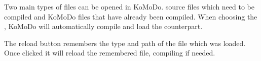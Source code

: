 \graphicspath{ {images/files/} }

Two main types of files can be opened in KoMoDo.  source files which need to be compiled and  KoMoDo files that have already been compiled. When choosing the , KoMoDo will automatically compile and load the  counterpart.

The reload button remembers the type and path of the file which was loaded. Once clicked it will reload the remembered file, compiling if needed.
